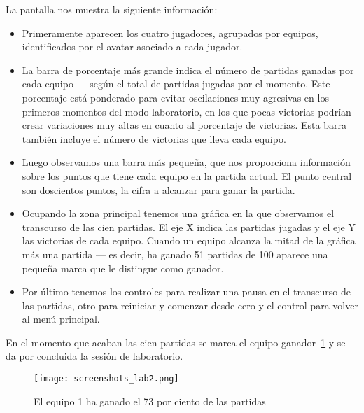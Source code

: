 La pantalla nos muestra la siguiente información:
\begin{itemize}
    \item Primeramente aparecen los cuatro jugadores, agrupados por equipos, identificados por el avatar asociado a cada jugador.
    \item La barra de porcentaje más grande indica el número de partidas ganadas por cada equipo --- según el total
            de partidas jugadas por el momento. Este porcentaje está ponderado para evitar oscilaciones muy agresivas
            en los primeros momentos del modo laboratorio, en los que pocas victorias podrían crear variaciones muy altas
            en cuanto al porcentaje de victorias. Esta barra también incluye el número de victorias que lleva cada equipo.
    \item Luego observamos una barra más pequeña, que nos proporciona información sobre los puntos que tiene cada
            equipo en la partida actual. El punto central son doscientos puntos, la cifra a alcanzar para ganar la partida. 
    \item Ocupando la zona principal tenemos una gráfica en la que observamos el transcurso de las cien partidas. El
            eje X indica las partidas jugadas y el eje Y las victorias de cada equipo. Cuando un equipo alcanza la mitad
            de la gráfica más una partida --- es decir, ha ganado 51 partidas de 100 aparece una pequeña marca que le
            distingue como ganador.
    \item Por último tenemos los controles para realizar una pausa en el transcurso de las partidas, otro para reiniciar
            y comenzar desde cero y el control para volver al menú principal.
\end{itemize}

En el momento que acaban las cien partidas se marca el equipo ganador~\ref{fig:screenshots_lab2} y se da por concluida
la sesión de laboratorio.

\begin{figure}[h]
  \begin{center}
    \texttt{[image: screenshots\_lab2.png]}
  \end{center}
  \caption{El equipo 1 ha ganado el 73 por ciento de las partidas}
  \label{fig:screenshots_lab2}
\end{figure}


